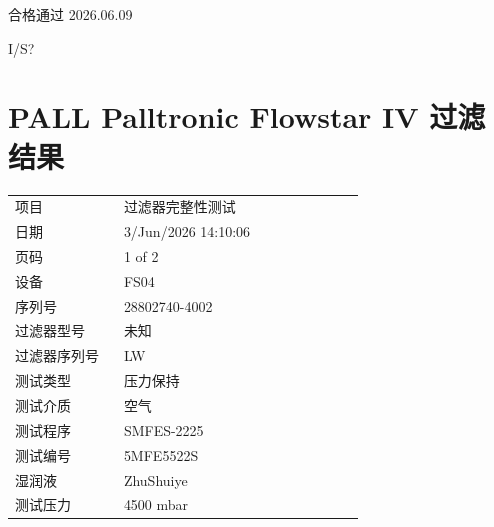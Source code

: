 \documentclass[UTF8,10pt,a4paper,fontset=fandol]{ctexart}
\newcommand{\fieldvalue}[1]{#1}
\newcommand{\handwritten}[1]{#1}
\begin{document}

\handwritten{合格通过 2026.06.09}

\handwritten{I/S?}

\newpage

\section*{PALL Palltronic Flowstar IV 过滤结果}

\begin{tabular}{@{}p{0.28\linewidth}p{0.62\linewidth}@{}}
项目 &
\fieldvalue{过滤器完整性测试}
\\[2pt]
日期 &
\fieldvalue{3/Jun/2026 14:10:06}
\\[2pt]
页码 &
\fieldvalue{1 of 2}
\\[2pt]
设备 &
\fieldvalue{FS04}
\\[2pt]
序列号 &
\fieldvalue{28802740-4002}
\\[2pt]
过滤器型号 &
\fieldvalue{未知}
\\[2pt]
过滤器序列号 &
\fieldvalue{LW}
\\[2pt]
测试类型 &
\fieldvalue{压力保持}
\\[2pt]
测试介质 &
\fieldvalue{空气}
\\[2pt]
测试程序 &
\fieldvalue{SMFES-2225}
\\[2pt]
测试编号 &
\fieldvalue{5MFE5522S}
\\[2pt]
湿润液 &
\fieldvalue{ZhuShuiye}
\\[2pt]
测试压力 &
\fieldvalue{4500 mbar}
\\[2pt]

\end{tabular}
\end{document}
